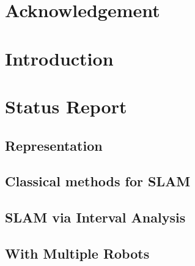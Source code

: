 \documentclass[12pt,fleqn]{report} %
\begin{document}
\renewcommand{\contentsname}{Contents}	%
\renewcommand{\bibname}{Bibliography}	%




\tableofcontents  %
\cleardoublepage  %


\chapter*{Acknowledgement}
\listoffigures  %
\chapter{Introduction}

\chapter{Status Report}
\section{Representation}

\section{Classical methods for SLAM}

\section{SLAM via Interval Analysis}

\section{With Multiple Robots}

\end{document}
